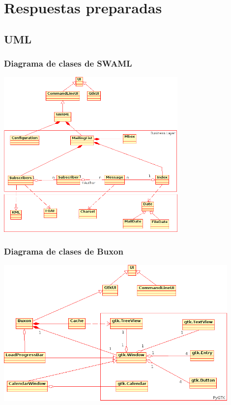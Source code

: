 \documentclass[spanish,notes=hide]{beamer}
\begin{document}
\appendix

\section{Respuestas preparadas}

\subsection{UML}
\frame
{
  \frametitle{Diagrama de clases de SWAML}
  \begin{center}
    \includegraphics[width=0.7\textwidth]{images/clases-swaml.png}
  \end{center}
}
\frame
{
  \frametitle{Diagrama de clases de Buxon}
  \begin{center}
    \includegraphics[width=0.9\textwidth]{images/clases-buxon.png}
  \end{center}
}
\end{document}
